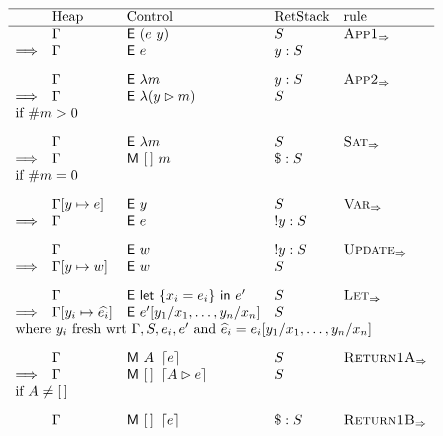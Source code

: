 \begin{figure*}
  \[
    \begin{array}{rllll} \hline
      & \text{Heap} & \text{Control} & \text{RetStack} & \text{rule} \\ \hline
      & \Gamma & \eval (e~\loc) & \retstack  & \smallrule{App1} \\
      \Longrightarrow & \Gamma & \eval e  & \loc:\retstack    \\[2ex]
      & \Gamma & \eval \lambda m & \loc:\retstack & \smallrule{App2} \\
      \Longrightarrow & \Gamma & \eval \lambda (\matcharg{\loc}{m}) & \retstack\\
      \multicolumn{5}{l}{\text{if}~\arity{m}>0} \\[2ex]
      & \Gamma & \eval \lambda m & \retstack & \smallrule{Sat} \\
      \Longrightarrow & \Gamma & \match{[\,]}{m} & \$:\retstack  \\
      \multicolumn{5}{l}{\text{if}~ \arity{m}=0}\\[2ex]
      & \Gamma[\loc\mapsto e] & \eval \loc & \retstack & \smallrule{Var} \\
      \Longrightarrow & \Gamma & \eval e  & !\loc : \retstack &   \\[2ex]
      & \Gamma  & \eval w  & !\loc : \retstack  & \smallrule{Update}  \\
      \Longrightarrow & \Gamma[\loc\mapsto w] & \eval w   & \retstack & \\[2ex]
      & \Gamma & \eval \llet{\{x_i=e_i\}}{e'}  & \retstack & \smallrule{Let} \\
      \Longrightarrow & \Gamma[\loc_i\mapsto \widehat{e_i}] & \eval e'[\loc_1/x_1,\ldots,\loc_n/x_n]   & \retstack \\
      \multicolumn{5}{l}{\text{where}~\loc_i~\text{fresh wrt}~\Gamma,S,e_i,e'~\text{and}~\widehat{e}_i = e_i[\loc_1/x_1,\ldots,\loc_n/x_n]}   \\[2ex]
      & \Gamma & \match {\argstack}{\matchreturn{e}} & \retstack &  \smallrule{Return1A} \\
      \Longrightarrow & \Gamma & \match{[\,]}{\matchreturn{\matcharg{A}{e}}} & \retstack & \\
      \multicolumn{5}{l}{\text{if}~\argstack \neq [\,]} \\[2ex]
      & \Gamma & \match {[\,]}{\matchreturn{e}} & \$:\retstack &  \smallrule{Return1B} \\

\end{array}\]
\end{figure*}
